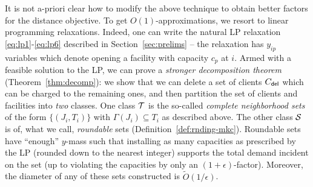 \iffalse
The weaker decomposition theorem (Theorem~\ref{thm:weakdecomp}) states that we can delete a subset $\Cd$ of clients and partition the residual instance into portions we call {\em complete neighborhood sets} (Definition~\ref{def:comp-nbr}) of $O(\log n/\epsilon)$ diameter.
These sets consists of subsets of facilities $T_i$ and clients $J_i$ such that the optimal solution \emph{must} assign clients in $J_i$ to facilities in $T_i$. This collection of complete-neighborhood sets then naturally leads to a \cckp instance (Remark~\ref{rem:red})
whose solutions translate to \mckc solutions with $O(\log n/\epsilon)$ hit on the cost. Furthermore, the deleted clients $\Cd$ can be charged to clients in $C\setminus \Cd$ such that the capacity of facilities only increase by an $\epsilon$-factor.
We use the {\em region growing technique} which have been used for cut problems~\cite{LeightonR99,GargVY96} to find the set $\Cd$; we keep on growing balls till the total external demand is at most $\epsilon$ times the internal demand.
$O(\log n/\eps)$-radius balls suffice. %
\fi

\medskip {} It is not a-priori clear how to modify the above technique to obtain better factors for the distance objective. To get $O(1)$-approximations, we resort to linear programming relaxations. Indeed, one can write the natural LP relaxation \eqref{eq:lp1}-\eqref{eq:lp6} described in Section~\ref{sec:prelims} -- the relaxation has $y_{ip}$ variables which denote opening a
facility with capacity $c_p$ at $i$.
Armed with a feasible solution to the LP, we can prove a \emph{stronger decomposition theorem} (Theorem~\ref{thm:decomp}): we show that we can delete a set of clients $\Cd$ which can be charged to the remaining ones, and then partition the set of clients and facilities into {\em two} classes.
One class ${\cal T}$  is the so-called \emph{complete neighborhood sets} of the form $\{(J_i, T_i)\}$ with $\Gamma(J_i) \subseteq T_i$ as described above. The other class ${\cal S}$  is of, what we call, {\em roundable} sets (Definition~\ref{def:rnding-mkc}). Roundable sets have ``enough'' $y$-mass such that installing as many  capacities as prescribed by the LP (rounded down to the nearest integer) supports the total demand incident on the set (up to violating the capacities by only an $(1+\epsilon)$-factor). Moreover, the diameter of any of these sets constructed is $\tilde{O}(1/\epsilon)$.

